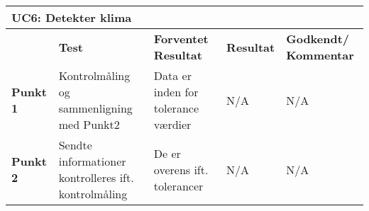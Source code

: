 \begin{table}[htbp] \centering
\begin{tabular}{|p{}|p{}|p{3cm}|p{3cm}|p{3cm}|} %
	\hline
\multicolumn{5}{|l|}{\textbf{UC6: Detekter klima}} \\\hline
&\textbf{Test} &\textbf{Forventet \newline Resultat} &\textbf{Resultat} &\textbf{Godkendt/ \newline Kommentar} \\\hline
\textbf{Punkt 1}		&Kontrolmåling og sammenligning med Punkt2 &Data er inden for tolerance værdier &
N/A	&
N/A \\\hline
\textbf{Punkt 2}		&Sendte informationer kontrolleres ift. kontrolmåling &
De er overens ift. tolerancer&
N/A	&
N/A \\\hline

\end{tabular}
\label{ATUC6} 
\end{table}